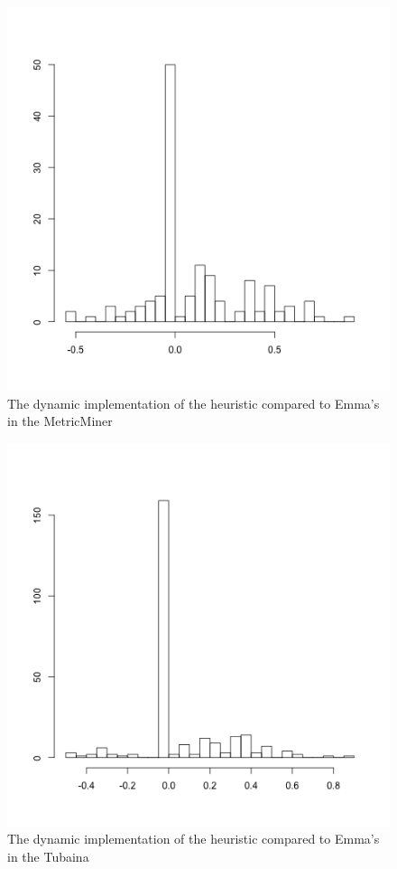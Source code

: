 \documentclass{sig-alternate}
\begin{document}
\begin{figure}[h!H]
  \centering
  \includegraphics[scale=0.4]{../stats/metricminer-histograma-aspectj.png}
  \caption{The dynamic implementation of the heuristic compared to Emma's in the MetricMiner}
  \label{fig:metricminer-aj}
\end{figure}

\begin{figure}[h!H]
  \centering
  \includegraphics[scale=0.4]{../stats/tubaina-histograma-aspectj.png}
  \caption{The dynamic implementation of the heuristic compared to Emma's in the Tubaina}
  \label{fig:tubaina-aj}
\end{figure}
\end{document}
